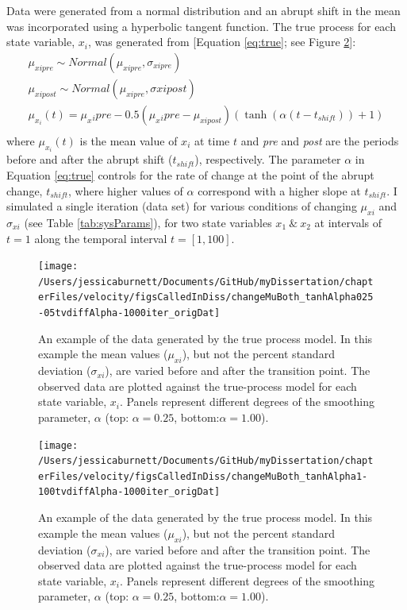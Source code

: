 \documentclass[12pt,twoside,openany]{reedthesis}
\begin{document}
Data were generated from a normal distribution and an abrupt shift in the mean was incorporated using a hyperbolic tangent function. The true process for each state variable, \(x_i\), was generated from {[}Equation \eqref{eq:true}; see Figure \ref{fig:trueObsEx}{]}:
\begin{equation}
\begin{array}{rcl}
\mu_{xipre}\sim Normal(\mu_{xipre},\sigma_{xipre}) \\ 
\mu_{xipost} \sim Normal(\mu_{xipre}, \sigma{xipost}) \\ 
\mu_{x_i}(t) = \mu_x{_ipre}  - 0.5(\mu_x{_ipre}-\mu_{xipost})(\tanh(\alpha (t-t_{shift}))+1) \\ 
\end{array}
\label{eq:true}
\end{equation}
where \(\mu_{x_i}(t)\) is the mean value of \(x_i\) at time \(t\) and \emph{pre} and \emph{post} are the periods before and after the abrupt shift (\(t_{shift}\)), respectively. The parameter \(\alpha\) in Equation \eqref{eq:true} controls for the rate of change at the point of the abrupt change, \(t_{shift}\), where higher values of \(\alpha\) correspond with a higher slope at \(t_{shift}\). I simulated a single iteration (data set) for various conditions of changing \(\mu_{xi}\) and \(\sigma_{xi}\) (see Table \ref{tab:sysParams}), for two state variables \(x_1\ \&\ x_2\) at intervals of \(t=1\) along the temporal interval \(t=[1,100]\).
\begin{figure}[bth]

{\centering \texttt{[image: /Users/jessicaburnett/Documents/GitHub/myDissertation/chapterFiles/velocity/figsCalledInDiss/changeMuBoth\_tanhAlpha025-05tvdiffAlpha-1000iter\_origDat]} 

}

\caption{An example of the data generated by the true process model. In this example the mean values ($\mu_{xi}$), but not the percent standard deviation ($\sigma_{xi}$), are varied before and after the transition point. The observed data are plotted against the true-process model for each state variable, $x_i$. Panels represent different degrees of the smoothing parameter, $\alpha$ (top: $\alpha=0.25$, bottom:$\alpha=1.00$).}\label{fig:trueObsEx}
\end{figure}
\begin{figure}[bth]

{\centering \texttt{[image: /Users/jessicaburnett/Documents/GitHub/myDissertation/chapterFiles/velocity/figsCalledInDiss/changeMuBoth\_tanhAlpha1-100tvdiffAlpha-1000iter\_origDat]} 

}

\caption{An example of the data generated by the true process model. In this example the mean values ($\mu_{xi}$), but not the percent standard deviation ($\sigma_{xi}$), are varied before and after the transition point. The observed data are plotted against the true-process model for each state variable, $x_i$. Panels represent different degrees of the smoothing parameter, $\alpha$ (top: $\alpha=0.25$, bottom:$\alpha=1.00$).}\label{fig:trueObsEx}
\end{figure}
\end{document}
